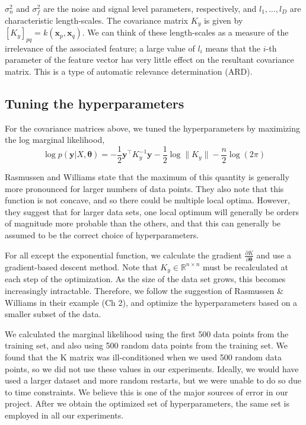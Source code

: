 \documentclass{article} %
\def\bfx{\mathbf x}
\def\bfy{\mathbf y}
\def\bftheta{\mathbf \theta}
\def\R{\mathbb R}
\begin{document}
$\sigma_n^2$ and $\sigma_f^2$ are the noise and signal level parameters, respectively, and $l_1, \dots, l_D$ are characteristic length-scales.
The covariance matrix $K_y$ is given by $[K_y]_{pq} = k(\bfx_p, \bfx_q)$.
We can think of these length-scales as a measure of the irrelevance of the associated feature; a large value of $l_i$ means that the $i$-th parameter of the feature vector has very little effect on the resultant covariance matrix.
This is a type of automatic relevance determination (ARD).


\subsection{Tuning the hyperparameters}
For the covariance matrices above, we tuned the hyperparameters by maximizing the log marginal likelihood, 
\begin{equation}
	\log p(\bfy | X, \bftheta) = - \frac{1}{2} \bfy^\top K_y^{-1} \bfy - \frac{1}{2} \log \| K_y \| - \frac{n}{2} \log (2 \pi)
\end{equation}

Rasmussen and Williams state that the maximum of this quantity is generally more pronounced for larger numbers of data points.
They also note that this function is not concave, and so there could be multiple local optima.
However, they suggest that for larger data sets, one local optimum will generally be orders of magnitude more probable than the others, and that this can generally be assumed to be the correct choice of hyperparameters.

For all except the exponential function, we calculate the gradient $\frac{\partial K} {\partial \bftheta}$ and use a gradient-based descent method.
Note that $K_y \in \R^{n \times n}$ must be recalculated at each step of the optimization.
As the size of the data set grows, this becomes increasingly intractable.
Therefore, we follow the suggestion of Rasmussen \& Williams in their example (Ch 2), and optimize the hyperparameters based on a smaller subset of the data.

We calculated the marginal likelihood using the first 500 data points from the training set, and also using 500 random data points from the training set.
We found that the K matrix was ill-conditioned when we used 500 random data points, so we did not use these values in our experiments.
Ideally, we would have used a larger dataset and more random restarts, but we were unable to do so due to time constraints.
We believe this is one of the major sources of error in our project.
After we obtain the optimized set of hyperparameters, the same set is employed in all our experiments.
\end{document}
